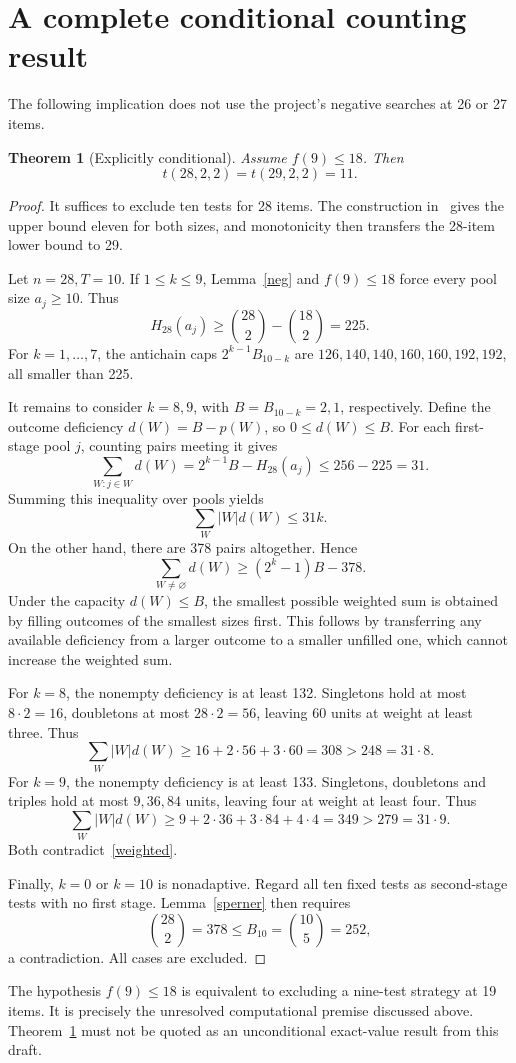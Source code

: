 \documentclass[11pt]{article}
\newtheorem{theorem}{Theorem}
\begin{document}
\section{A complete conditional counting result}
The following implication does not use the project's negative searches at 26 or 27 items.
\begin{theorem}[Explicitly conditional]\label{cond}
Assume $f(9)\le18$. Then
\[
t(28,2,2)=t(29,2,2)=11.
\]
\end{theorem}
\begin{proof}
It suffices to exclude ten tests for 28 items. The construction in~\cite[Proposition 15]{DSW} gives the upper bound eleven for both sizes, and monotonicity then transfers the 28-item lower bound to 29.

Let $n=28,T=10$. If $1\le k\le9$, Lemma~\ref{neg} and $f(9)\le18$ force every pool size $a_j\ge10$. Thus
\[
H_{28}(a_j)\ge\binom{28}2-\binom{18}2=225.
\]
For $k=1,\ldots,7$, the antichain caps $2^{k-1}B_{10-k}$ are $126,140,140,160,160,192,192$, all smaller than 225.

It remains to consider $k=8,9$, with $B=B_{10-k}=2,1$, respectively. Define the outcome deficiency $d(W)=B-p(W)$, so $0\le d(W)\le B$. For each first-stage pool $j$, counting pairs meeting it gives
\[
\sum_{W:j\in W}d(W)=2^{k-1}B-H_{28}(a_j)\le256-225=31.
\]
Summing this inequality over pools yields
\begin{equation}\label{weighted}
\sum_W |W|d(W)\le31k.
\end{equation}
On the other hand, there are 378 pairs altogether. Hence
\[
\sum_{W\ne\varnothing}d(W)\ge(2^k-1)B-378.
\]
Under the capacity $d(W)\le B$, the smallest possible weighted sum is obtained by filling outcomes of the smallest sizes first. This follows by transferring any available deficiency from a larger outcome to a smaller unfilled one, which cannot increase the weighted sum.

For $k=8$, the nonempty deficiency is at least 132. Singletons hold at most $8\cdot2=16$, doubletons at most $28\cdot2=56$, leaving 60 units at weight at least three. Thus
\[
\sum_W |W|d(W)\ge16+2\cdot56+3\cdot60=308>248=31\cdot8.
\]
For $k=9$, the nonempty deficiency is at least 133. Singletons, doubletons and triples hold at most $9,36,84$ units, leaving four at weight at least four. Thus
\[
\sum_W |W|d(W)\ge9+2\cdot36+3\cdot84+4\cdot4=349>279=31\cdot9.
\]
Both contradict~\eqref{weighted}.

Finally, $k=0$ or $k=10$ is nonadaptive. Regard all ten fixed tests as second-stage tests with no first stage. Lemma~\ref{sperner} then requires
\[
\binom{28}2=378\le B_{10}=\binom{10}5=252,
\]
a contradiction. All cases are excluded.
\end{proof}
The hypothesis $f(9)\le18$ is equivalent to excluding a nine-test strategy at 19 items. It is precisely the unresolved computational premise discussed above. Theorem~\ref{cond} must not be quoted as an unconditional exact-value result from this draft.
\end{document}

